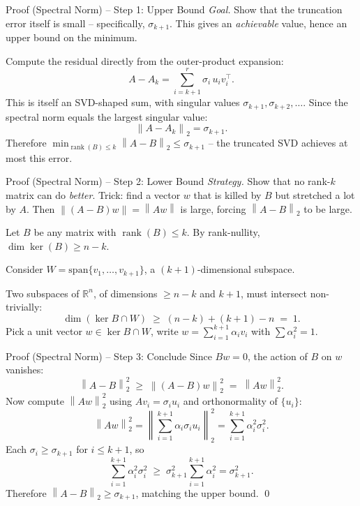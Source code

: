 \documentclass[10pt,aspectratio=169]{beamer}
\DeclareMathOperator{\rank}{rank}
\newcommand{\R}{\mathbb{R}}
\newcommand{\norm}[1]{\left\|#1\right\|}
\begin{document}
\begin{frame}{Proof (Spectral Norm) -- Step 1: Upper Bound}
  \emph{Goal.} Show that the truncation error itself is small -- specifically, $\sigma_{k+1}$. This gives an \emph{achievable} value, hence an upper bound on the minimum.

  \medskip
  Compute the residual directly from the outer-product expansion:
  \[
    A - A_k = \sum_{i=k+1}^{r} \sigma_i\, u_i v_i^\top.
  \]
  This is itself an SVD-shaped sum, with singular values $\sigma_{k+1}, \sigma_{k+2}, \ldots$. Since the spectral norm equals the largest singular value:
  \[
    \norm{A - A_k}_2 = \sigma_{k+1}.
  \]
  Therefore $\displaystyle \min_{\rank(B)\leq k} \norm{A - B}_2 \leq \sigma_{k+1}$ -- the truncated SVD achieves at most this error.
\end{frame}

\begin{frame}{Proof (Spectral Norm) -- Step 2: Lower Bound}
  \emph{Strategy.} Show that no rank-$k$ matrix can do \emph{better}. Trick: find a vector $w$ that is killed by $B$ but stretched a lot by $A$. Then $\norm{(A-B)w} = \norm{Aw}$ is large, forcing $\norm{A-B}_2$ to be large.
  \medskip

  Let $B$ be any matrix with $\rank(B) \leq k$. By rank-nullity, $\dim \ker(B) \geq n - k$.

  \medskip
  Consider $W = \mathrm{span}\{v_1, \dots, v_{k+1}\}$, a $(k+1)$-dimensional subspace.

  \medskip
  Two subspaces of $\R^n$, of dimensions $\geq n-k$ and $k+1$, must intersect non-trivially:
  \[
    \dim(\ker B \cap W) \;\geq\; (n-k) + (k+1) - n \;=\; 1.
  \]
  Pick a unit vector $w \in \ker B \cap W$, write $w = \sum_{i=1}^{k+1} \alpha_i v_i$ with $\sum \alpha_i^2 = 1$.
\end{frame}

\begin{frame}{Proof (Spectral Norm) -- Step 3: Conclude}
  Since $Bw = 0$, the action of $B$ on $w$ vanishes:
  \[
    \norm{A - B}_2^2 \;\geq\; \norm{(A-B)w}_2^2 \;=\; \norm{Aw}_2^2.
  \]
  Now compute $\norm{Aw}_2^2$ using $A v_i = \sigma_i u_i$ and orthonormality of $\{u_i\}$:
  \[
    \norm{Aw}_2^2 = \norm{\sum_{i=1}^{k+1} \alpha_i \sigma_i u_i}_2^2 = \sum_{i=1}^{k+1} \alpha_i^2 \sigma_i^2.
  \]
  Each $\sigma_i \geq \sigma_{k+1}$ for $i \leq k+1$, so
  \[
    \sum_{i=1}^{k+1} \alpha_i^2 \sigma_i^2 \;\geq\; \sigma_{k+1}^2 \sum_{i=1}^{k+1} \alpha_i^2 = \sigma_{k+1}^2.
  \]
  Therefore $\norm{A - B}_2 \geq \sigma_{k+1}$, matching the upper bound. \qed
\end{frame}
\end{document}
